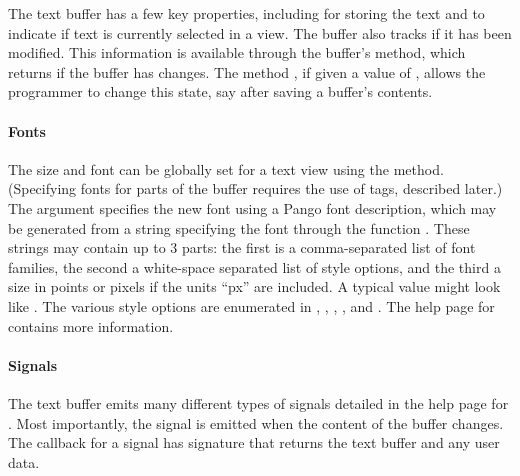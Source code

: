 The text buffer has a few key properties, including  for
storing the text and  to indicate if text is
currently selected in a view. The buffer also tracks if it has been
modified. This information is available through the buffer's
 method, which returns 
if the buffer has changes. The method
, if given a value of ,
allows the programmer to change this state, say after saving a
buffer's contents.


\paragraph{Fonts}
The size and font can be globally set for a text view using the
 method. (Specifying fonts for parts of
the buffer requires the use of tags, described later.) The argument
 specifies the new font using
a Pango font description, which may be generated from a
string specifying the font through the function
. These strings may contain up to
3 parts: the first is a comma-separated list of font families, the
second a white-space separated list of style options, and the third a
size in points or pixels if the units ``px'' are included. A typical
value might look like . The various style options are enumerated in ,
, , , and
. The help page for 
contains more information.

\paragraph{Signals}
The text buffer emits many different types of signals detailed in the
help page for . Most importantly, the
 signal is emitted when the content of the buffer
changes. The callback for a  signal has signature that
returns the text buffer and any user data.







